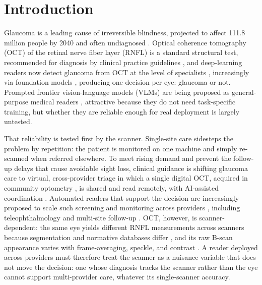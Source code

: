\section{Introduction}
\label{sec:intro}

Glaucoma is a leading cause of irreversible blindness, projected to affect 111.8 million people by 2040
\citep{tham2014global} and often undiagnosed \citep{soh2021undetected}. Optical coherence tomography (OCT) of the
retinal nerve fiber layer (RNFL) is a standard
structural test, recommended for diagnosis by clinical practice guidelines \citep{gedde2021ppp}, and deep-learning
readers now detect glaucoma from OCT at the level of specialists \citep{ran2019oct}, increasingly via foundation
models \citep{zhou2023retfound}, producing one decision per eye: glaucoma or not. Prompted frontier vision-language models (VLMs) are being proposed as
general-purpose medical readers \citep{chen2024gmaimmbench, qin2024lmod}, attractive because they do not need task-specific training, but whether they are reliable enough for real deployment is largely untested.

That reliability is tested first by the scanner. Single-site care sidesteps the problem by repetition: the patient is
monitored on one machine and simply re-scanned when referred elsewhere. To meet rising demand
and prevent the follow-up delays that cause avoidable sight loss, clinical guidance is shifting glaucoma care to
virtual, cross-provider triage in which a single digital OCT, acquired in community optometry \citep{jindal2019}, is
shared and read remotely, with AI-assisted coordination \citep{girft2026glaucoma}. Automated readers that support the
decision are increasingly proposed to scale such screening and monitoring across providers
\citep{ting2019ai}, including teleophthalmology \citep{thomas2014teleglaucoma} and multi-site follow-up
\citep{niceng81, gedde2021ppp}. OCT, however, is scanner-dependent: the same eye yields different RNFL measurements
across scanners because segmentation and normative databases differ \citep{buchser2012}, and its raw B-scan
appearance varies with frame-averaging, speckle, and contrast \citep{schmitt1999speckle}. A reader deployed across
providers must therefore treat the scanner as a nuisance variable that does not move the decision: one whose
diagnosis tracks the scanner rather than the eye cannot support multi-provider care, whatever its single-scanner
accuracy.

